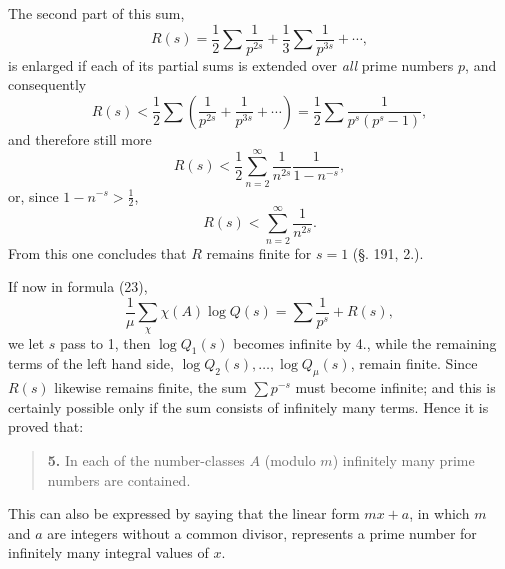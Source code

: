 \documentclass[11pt]{article}
\begin{document}
The second part of this sum,
\[
R(s)=\frac12\sum\frac1{p^{2s}}+\frac13\sum\frac1{p^{3s}}+\cdots,
\]
is enlarged if each of its partial sums is extended over \emph{all} prime numbers $p$, and consequently
\[
R(s)<\frac12\sum\left(\frac1{p^{2s}}+\frac1{p^{3s}}+\cdots\right)
=\frac12\sum\frac1{p^s(p^s-1)},
\]
and therefore still more
\[
R(s)<\frac12\sum_{n=2}^{\infty}\frac1{n^{2s}}\frac1{1-n^{-s}},
\]
or, since $1-n^{-s}>\frac12$,
\[
R(s)<\sum_{n=2}^{\infty}\frac1{n^{2s}}.
\]
From this one concludes that $R$ remains finite for $s=1$ (§. 191, 2.).

If now in formula (23),
\[
\frac1\mu\sum_\chi \chi(A)\log Q(s)=\sum\frac1{p^s}+R(s),
\]
we let $s$ pass to 1, then $\log Q_1(s)$ becomes infinite by 4., while the remaining terms of the left hand side, $\log Q_2(s),\ldots,\log Q_\mu(s)$, remain finite. Since $R(s)$ likewise remains finite, the sum $\sum p^{-s}$ must become infinite; and this is certainly possible only if the sum consists of infinitely many terms. Hence it is proved that:

\begin{quote}
\textbf{5.} In each of the number-classes $A$ (modulo $m$) infinitely many prime numbers are contained.
\end{quote}

This can also be expressed by saying that the linear form $mx+a$, in which $m$ and $a$ are integers without a common divisor, represents a prime number for infinitely many integral values of $x$.
\end{document}
